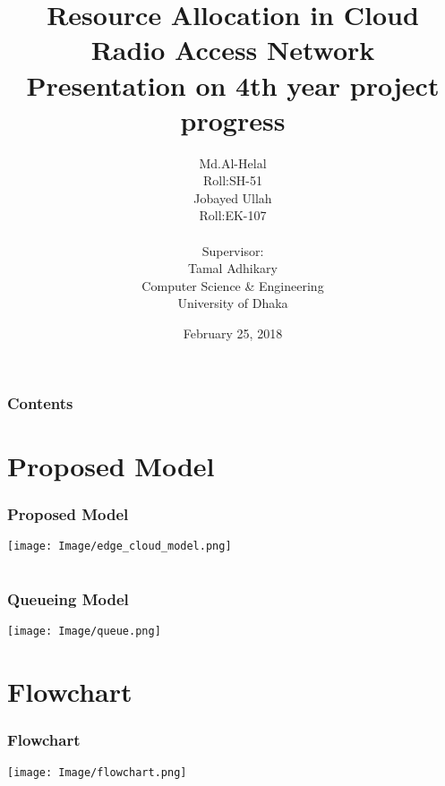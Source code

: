 \documentclass[usenames,dvipsnames]{beamer}
\begin{document}
  \title{Resource  Allocation in Cloud Radio Access Network\\Presentation on 4th year project progress}
  \author[Md.Al-Helal \& Jobayed Ullah]{
  \parbox{2.5cm}{
\centering Md.Al-Helal\\Roll:SH-51}\hspace{3cm}
\parbox{2.5cm}{
{\centering Jobayed Ullah\\Roll:EK-107}}
\centering \vspace{1cm}\\Supervisor:\\Tamal Adhikary\\\scriptsize{Computer Science \& Engineering\\University of Dhaka}
}

\vspace{1cm}
\date{February 25, 2018}
\begin{frame}
  \maketitle
\end{frame}

\begin{frame}
\frametitle{Contents}
\tableofcontents
\end{frame}
\section{Proposed Model}

\begin{frame}
  \frametitle{Proposed Model}
  \texttt{[image: Image/edge\_cloud\_model.png]}
\end{frame}

\section{}
\begin{frame}
  \frametitle{Queueing Model}
  \begin{center}
  \texttt{[image: Image/queue.png]}
\end{center}
  \end{frame}

\section{Flowchart}
\begin{frame}
  \frametitle{Flowchart}
  \vspace*{-0.9cm}
  \begin{center}
  \texttt{[image: Image/flowchart.png]}
  \end{center}
  \end{frame}
\end{document}
